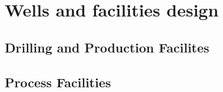 \chapter{Wells and facilities design}
\section{Drilling and Production Facilites}
\section{Process Facilities}

